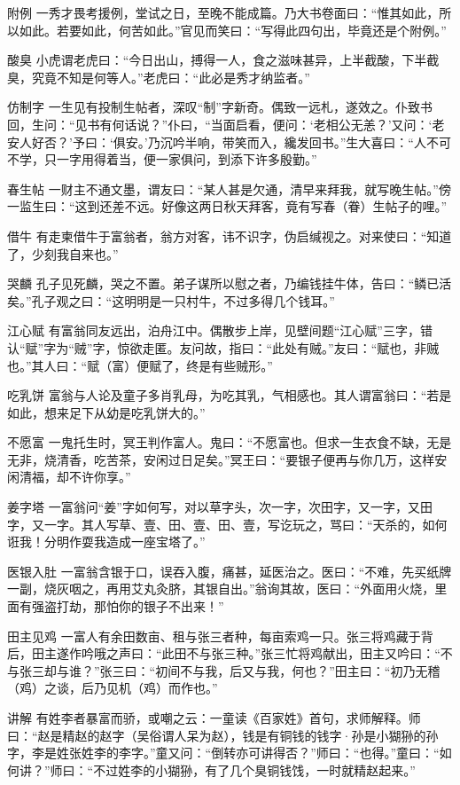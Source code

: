 \documentclass[12pt,UTF8]{ctexbook}
\begin{document}
附例
一秀才畏考援例，堂试之日，至晚不能成篇。乃大书卷面曰：“惟其如此，所以如此。若要如此，何苦如此。”官见而笑曰：“写得此四句出，毕竟还是个附例。”

酸臭
小虎谓老虎曰：“今日出山，搏得一人，食之滋味甚异，上半截酸，下半截臭，究竟不知是何等人。”老虎曰：“此必是秀才纳监者。”

仿制字
一生见有投制生帖者，深叹“制”字新奇。偶致一远札，遂效之。仆致书回，生问：“见书有何话说？”仆曰，“当面启看，便问：‘老相公无恙？’又问：‘老安人好否？’予曰：‘俱安。’乃沉吟半响，带笑而入，纔发回书。”生大喜曰：“人不可不学，只一字用得着当，便一家俱问，到添下许多殷勤。”

春生帖
一财主不通文墨，谓友曰：“某人甚是欠通，清早来拜我，就写晚生帖。”傍一监生曰：“这到还差不远。好像这两日秋天拜客，竟有写春（眷）生帖子的哩。”

借牛
有走柬借牛于富翁者，翁方对客，讳不识字，伪启缄视之。对来使曰：“知道了，少刻我自来也。”

哭麟
孔子见死麟，哭之不置。弟子谋所以慰之者，乃编钱挂牛体，告曰：“鳞已活矣。”孔子观之曰：“这明明是一只村牛，不过多得几个钱耳。”

江心赋
有富翁同友远出，泊舟江中。偶散步上岸，见壁间题“江心赋”三字，错认“赋”字为“贼”字，惊欲走匿。友问故，指曰：“此处有贼。”友曰：“赋也，非贼也。”其人曰：“赋（富）便赋了，终是有些贼形。”

吃乳饼
富翁与人论及童子多肖乳母，为吃其乳，气相感也。其人谓富翁曰：“若是如此，想来足下从幼是吃乳饼大的。”

不愿富
一鬼托生时，冥王判作富人。鬼曰：“不愿富也。但求一生衣食不缺，无是无非，烧清香，吃苦茶，安闲过日足矣。”冥王曰：“要银子便再与你几万，这样安闲清福，却不许你享。”

姜字塔
一富翁问“姜”字如何写，对以草字头，次一字，次田字，又一字，又田字，又一字。其人写草、壹、田、壹、田、壹，写讫玩之，骂曰：“天杀的，如何诳我！分明作耍我造成一座宝塔了。”

医银入肚
一富翁含银于口，误吞入腹，痛甚，延医治之。医曰：“不难，先买纸牌一副，烧灰咽之，再用艾丸灸脐，其银自出。”翁询其故，医曰：“外面用火烧，里面有强盗打劫，那怕你的银子不出来！”

田主见鸡
一富人有余田数亩、租与张三者种，每亩索鸡一只。张三将鸡藏于背后，田主遂作吟哦之声曰：“此田不与张三种。”张三忙将鸡献出，田主又吟曰：“不与张三却与谁？”张三曰：“初间不与我，后又与我，何也？”田主曰：“初乃无稽（鸡）之谈，后乃见机（鸡）而作也。”

讲解
有姓李者暴富而骄，或嘲之云：一童读《百家姓》首句，求师解释。师曰：“赵是精赵的赵字（吴俗谓人呆为赵），钱是有铜钱的钱字·孙是小猢狲的孙字，李是姓张姓李的李字。”童又问：“倒转亦可讲得否？”师曰：“也得。”童曰：“如何讲？”师曰：“不过姓李的小猢狲，有了几个臭铜钱饯，一时就精赵起来。”
\end{document}
